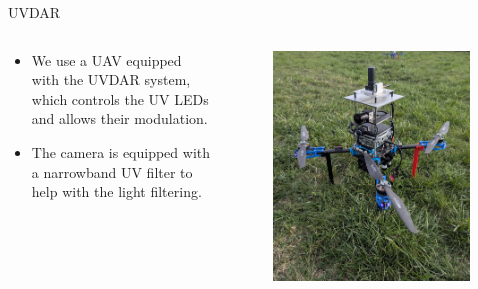 \documentclass{beamer}
\begin{document}
\begin{frame}{UVDAR}

\begin{columns}[T]

\begin{column}{0.48\textwidth}
    \vspace{0.5cm}
    \begin{itemize}
        \item We use a UAV equipped with the UVDAR system, which controls the UV LEDs and allows their modulation.
        \item The camera is equipped with a narrowband UV filter to help with the light filtering.
    \end{itemize}
\end{column}

\begin{column}{0.48\textwidth}
    \begin{figure}[H]
        \centering
        \includegraphics[width=0.99\textwidth]{../fig/photos/uvdar.jpg}
        \label{fig:uvdar}
    \end{figure}
\end{column}

\end{columns}

\end{frame}
\end{document}
